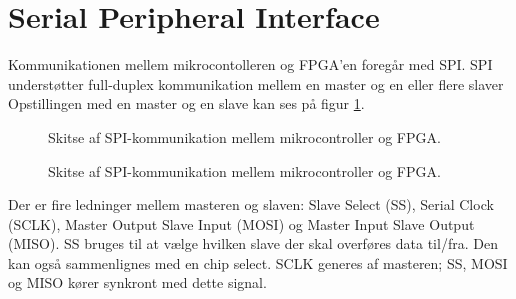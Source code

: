 \section{Serial Peripheral Interface}
\label{app:spi}
Kommunikationen mellem mikrocontolleren og FPGA’en foregår med SPI. %
SPI understøtter full-duplex kommunikation mellem en master og en eller flere slaver
Opstillingen med en master og en slave kan ses på figur \ref{fig:SPImasterslave}.
\begin{figure}[!th]
\centering
\begin{tikzpicture}[scale=0.8]

\end{tikzpicture}
\caption[SPI protokol]{Skitse af SPI-kommunikation mellem mikrocontroller og FPGA.}
\label{fig:SPImasterslave}
\end{figure}
\begin{figure}[!th]
\centering
\begin{tikzpicture}[scale=0.8]

\end{tikzpicture}
\caption[SPI protokol]{Skitse af SPI-kommunikation mellem mikrocontroller og FPGA.}
\label{fig:SPIfigur}
\end{figure}

Der er fire ledninger mellem masteren og slaven: Slave Select (SS), Serial Clock (SCLK), Master Output Slave Input (MOSI) og Master Input Slave Output (MISO). SS bruges til at vælge hvilken slave der skal overføres data til/fra. Den kan også sammenlignes med en chip select. SCLK generes af masteren; SS, MOSI og MISO kører synkront med dette signal.